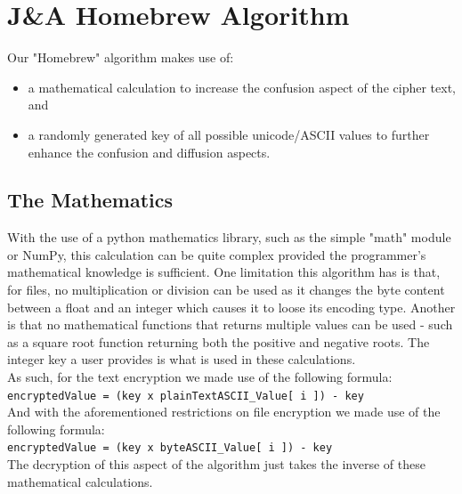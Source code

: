 \documentclass[a4paper, 12pt, titlepage]{report}
\begin{document}
\section{J\&A Homebrew Algorithm}
Our "Homebrew" algorithm makes use of:
\begin{itemize}
\item a mathematical calculation to increase the confusion aspect of the cipher text, and
\item a randomly generated key of all possible unicode/ASCII values to further enhance the confusion and diffusion aspects.
\end{itemize}
\subsection{The Mathematics}
With the use of a python mathematics library, such as the simple "math" module or NumPy, this calculation can be quite complex provided the programmer's mathematical knowledge is sufficient. One limitation this algorithm has is that, for files, no multiplication or division can be used as it changes the byte content between a float and an integer which causes it to loose its encoding type. Another is that no mathematical functions that returns multiple values can be used - such as a square root function returning both the positive and negative roots. The integer key a user provides is what is used in these calculations.
\\
As such, for the text encryption we made use of the following formula:\\
\texttt{encryptedValue = (key x plainTextASCII\_Value[ i ]) - key}\\
And with the aforementioned restrictions on file encryption we made use of the following formula:\\
\texttt{encryptedValue = (key x byteASCII\_Value[ i ]) - key}\\
The decryption of this aspect of the algorithm just takes the inverse of these mathematical calculations.
\end{document}
